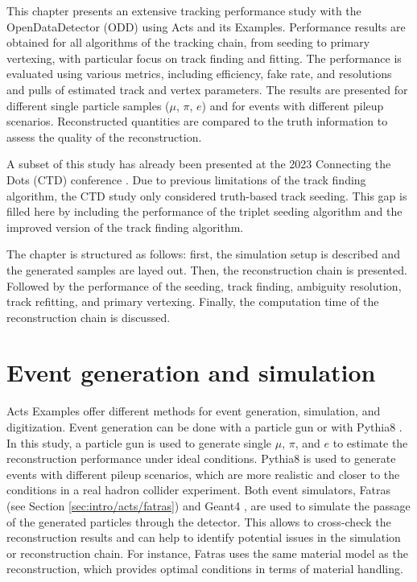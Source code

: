 This chapter presents an extensive tracking performance study with the OpenDataDetector (ODD) using Acts and its Examples. Performance results are obtained for all algorithms of the tracking chain, from seeding to primary vertexing, with particular focus on track finding and fitting. The performance is evaluated using various metrics, including efficiency, fake rate, and resolutions and pulls of estimated track and vertex parameters. The results are presented for different single particle samples ($\mu$, $\pi$, $e$) and for \ttbar events with different pileup scenarios. Reconstructed quantities are compared to the truth information to assess the quality of the reconstruction.

A subset of this study has already been presented at the 2023 Connecting the Dots (CTD) conference \cite{ctd-acts-odd}. Due to previous limitations of the track finding algorithm, the CTD study only considered truth-based track seeding. This gap is filled here by including the performance of the triplet seeding algorithm and the improved version of the track finding algorithm.

The chapter is structured as follows: first, the simulation setup is described and the generated samples are layed out. Then, the reconstruction chain is presented. Followed by the performance of the seeding, track finding, ambiguity resolution, track refitting, and primary vertexing. Finally, the computation time of the reconstruction chain is discussed.

\section{Event generation and simulation}

Acts Examples offer different methods for event generation, simulation, and digitization. Event generation can be done with a particle gun or with Pythia8 \cite{pythia8}. In this study, a particle gun is used to generate single $\mu$, $\pi$, and $e$ to estimate the reconstruction performance under ideal conditions. Pythia8 is used to generate \ttbar events with different pileup scenarios, which are more realistic and closer to the conditions in a real hadron collider experiment. Both event simulators, Fatras (see Section \ref{sec:intro/acts/fatras}) and Geant4 \cite{geant4-2003}\cite{geant4-2006}\cite{geant4-2016}, are used to simulate the passage of the generated particles through the detector. This allows to cross-check the reconstruction results and can help to identify potential issues in the simulation or reconstruction chain. For instance, Fatras uses the same material model as the reconstruction, which provides optimal conditions in terms of material handling.

